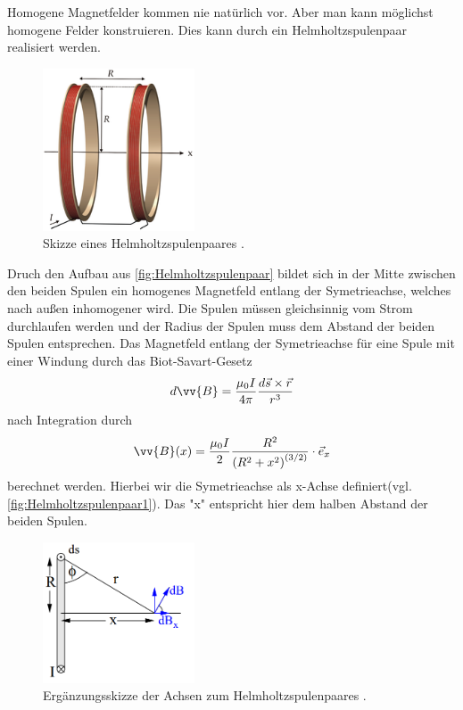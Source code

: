 Homogene Magnetfelder kommen nie natürlich vor. Aber man kann möglichst homogene Felder konstruieren. Dies kann durch ein Helmholtzspulenpaar realisiert werden.
\begin{figure}
	\centering
    \includegraphics[width=0.4\textwidth]{content/Helmholtz_coils.png}
	\caption{Skizze eines Helmholtzspulenpaares \cite{Helmholtzspulenpaar}.}
	\label{fig:Helmholtzspulenpaar}
\end{figure}
Druch den Aufbau aus \autoref{fig:Helmholtzspulenpaar} bildet sich in der Mitte zwischen den beiden Spulen ein homogenes Magnetfeld entlang der Symetrieachse, welches 
nach außen inhomogener wird. Die Spulen müssen gleichsinnig vom Strom durchlaufen werden und der Radius der Spulen muss dem Abstand der beiden Spulen entsprechen. Das Magnetfeld
entlang der Symetrieachse für eine Spule mit einer Windung durch das Biot-Savart-Gesetz
\begin{equation}
    \label{eqn:diff_Biot-Savart}
    d\vv{B} = \frac{\mu_0 I}{4\pi}\frac{d\vec{s}\times\vec{r}}{r^3}
\end{equation}
nach Integration durch
\begin{equation}
    \label{eqn:Biot-Savart_1}
    \vv{B}(x) = \frac{\mu_0 I}{2}\frac{R^2}{\left(R^2 + x^2 \right)^{(3/2)}}\cdot \vec{e}_x
\end{equation}
berechnet werden. Hierbei wir die Symetrieachse als x-Achse definiert(vgl. \autoref{fig:Helmholtzspulenpaar1}). Das "x" entspricht hier dem halben Abstand der beiden Spulen. 
\begin{figure}
	\centering
    \includegraphics[width=0.4\textwidth]{content/Helmholtzachsen.PNG}
	\caption{Ergänzungsskizze der Achsen zum Helmholtzspulenpaares  \cite{v105}.}
	\label{fig:Helmholtzspulenpaar1}
\end{figure}
